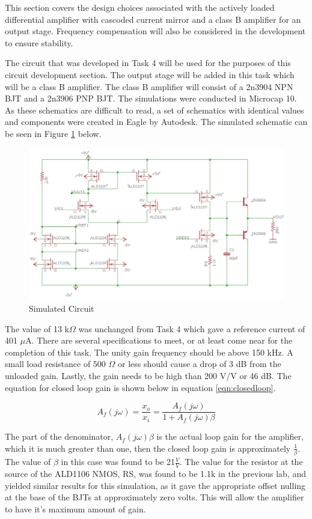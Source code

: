 


This section covers the design choices associated with the actively loaded differential amplifier with cascoded current mirror and a class B amplifier for an output stage. Frequency compensation will also be considered in the development to ensure stability.

The circuit that was developed in Task 4 will be used for the purposes of this circuit development section. The output stage will be added in this task which will be a class B amplifier. The class B amplifier will consist of a 2n3904 NPN BJT and a 2n3906 PNP BJT. The simulations were conducted in Microcap 10. As these schematics are difficult to read, a set of schematics with identical values and components were created in Eagle by Autodesk. The simulated schematic can be seen in Figure \ref{fig:simschem} below.

\begin{figure}[H]
	\centering
	\includegraphics[width=0.8\linewidth]{CircuitDevelopment/schematicsimulation.png}
	\caption{Simulated Circuit}
	\label{fig:simschem}
\end{figure}

The value of 13 k$\Omega$ was unchanged from Task 4 which gave a reference current of 401 $\mu$A. There are several specifications to meet, or at least come near for the completion of this task. The unity gain frequency should be above 150 kHz. A small load resistance of 500 $\Omega$ or less should cause a drop of 3 dB from the unloaded gain. Lastly, the gain needs to be high than 200 V/V or 46 dB. The equation for closed loop gain is shown below in equation \ref{eqn:closedloop}.

\begin{equation}
A_f(j\omega) = \frac{x_o}{x_i} = \frac{A_f(j\omega)}{1+A_f(j\omega)\beta}
\label{eqn:closedloop}
\end{equation}

The part of the denominator, $A_f(j\omega)\beta$ is the actual loop gain for the amplifier, which it is much greater than one, then the closed loop gain is approximately $\frac{1}{\beta}$. The value of $\beta$ in this case was found to be 21$\frac{V}{V} $. The value for the resistor at the source of the ALD1106 NMOS, RS, was found to be 1.1k in the previous lab, and yielded similar results for this simulation, as it gave the appropriate offset nulling at the base of the BJTs at approximately zero volts. This will allow the amplifier to have it's maximum amount of gain. 

